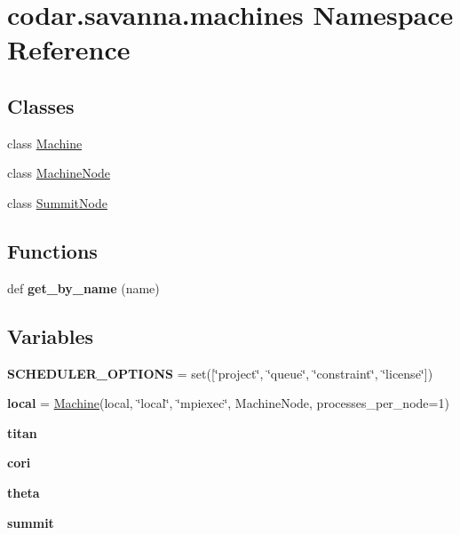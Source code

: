 \hypertarget{namespacecodar_1_1savanna_1_1machines}{}\section{codar.\+savanna.\+machines Namespace Reference}
\label{namespacecodar_1_1savanna_1_1machines}
\subsection*{Classes}
\begin{DoxyCompactItemize}
\item 
class \hyperlink{classcodar_1_1savanna_1_1machines_1_1_machine}{Machine}
\item 
class \hyperlink{classcodar_1_1savanna_1_1machines_1_1_machine_node}{Machine\+Node}
\item 
class \hyperlink{classcodar_1_1savanna_1_1machines_1_1_summit_node}{Summit\+Node}
\end{DoxyCompactItemize}
\subsection*{Functions}
\begin{DoxyCompactItemize}
\item 
\mbox{\label{namespacecodar_1_1savanna_1_1machines_ac40865c4cf034c7fa8326851739415c4}} 
def {\bfseries get\+\_\+by\+\_\+name} (name)
\end{DoxyCompactItemize}
\subsection*{Variables}
\begin{DoxyCompactItemize}
\item 
\mbox{\label{namespacecodar_1_1savanna_1_1machines_a7049022ca489351967d953e3cbb4d0b0}} 
{\bfseries S\+C\+H\+E\+D\+U\+L\+E\+R\+\_\+\+O\+P\+T\+I\+O\+NS} = set(\mbox{[}\char`\"{}project\char`\"{}, \char`\"{}queue\char`\"{}, \char`\"{}constraint\char`\"{}, \char`\"{}license\char`\"{}\mbox{]})
\item 
\mbox{\label{namespacecodar_1_1savanna_1_1machines_a5bc83c52f88721fcf5e8898f280bb460}} 
{\bfseries local} = \hyperlink{classcodar_1_1savanna_1_1machines_1_1_machine}{Machine}(\textquotesingle{}local\textquotesingle{}, \char`\"{}local\char`\"{}, \char`\"{}mpiexec\char`\"{}, Machine\+Node, processes\+\_\+per\+\_\+node=1)
\item 
{\bfseries titan}
\item 
{\bfseries cori}
\item 
{\bfseries theta}
\item 
{\bfseries summit}
\end{DoxyCompactItemize}


